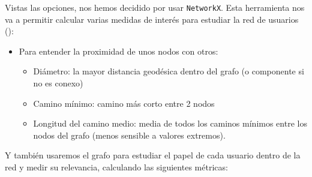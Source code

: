 Vistas las opciones, nos hemos decidido por usar {\tt NetworkX}.
Esta herramienta nos va a permitir calcular varias medidas
de interés para estudiar la red de usuarios (\cite{notas_fernando}):
\begin{itemize}
\item Para entender la proximidad de unos nodos con otros:
\begin{itemize}
\item Diámetro: la mayor distancia geodésica dentro del grafo (o componente si no es conexo)
\item Camino mínimo: camino más corto entre 2 nodos
\item Longitud del camino medio: media de todos los caminos mínimos entre los 
nodos del grafo (menos sensible a valores extremos).
\end{itemize}
\end{itemize}
Y también usaremos el grafo para estudiar el papel de cada usuario dentro de la red
y medir su relevancia, calculando las siguientes métricas:
